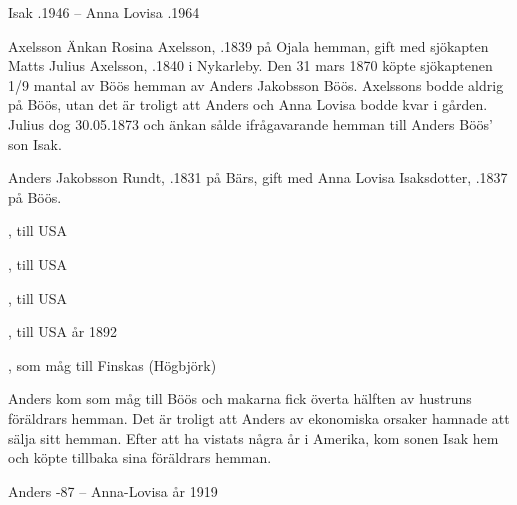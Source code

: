 Isak .1946  --  Anna Lovisa .1964


Axelsson Änkan Rosina Axelsson, .1839 på Ojala hemman, gift med sjökapten Matts Julius Axelsson, .1840 i Nykarleby. Den 31 mars 1870 köpte sjökaptenen 1/9 mantal av Böös hemman av Anders Jakobsson Böös. Axelssons bodde aldrig på Böös, utan det är troligt att Anders och Anna Lovisa bodde kvar i gården. Julius dog 30.05.1873 och änkan sålde ifrågavarande hemman till Anders Böös' son Isak.


Anders Jakobsson Rundt, .1831 på Bärs, gift med Anna Lovisa Isaksdotter, .1837 på Böös.
\begin{jhchildren}
  \item {}
  \item {}, till USA
  \item {}
  \item {}, till USA
  \item {}, till USA
  \item {}
  \item {}, till USA år 1892
  \item {}, som måg till Finskas (Högbjörk)
  \item {}
\end{jhchildren}
Anders kom som måg till Böös och makarna fick överta hälften av hustruns föräldrars hemman. Det  är troligt att Anders av ekonomiska orsaker hamnade att sälja sitt hemman. Efter att ha vistats några år i Amerika, kom sonen Isak hem och köpte tillbaka sina föräldrars hemman.

Anders -87  --  Anna-Lovisa \textdied år 1919


